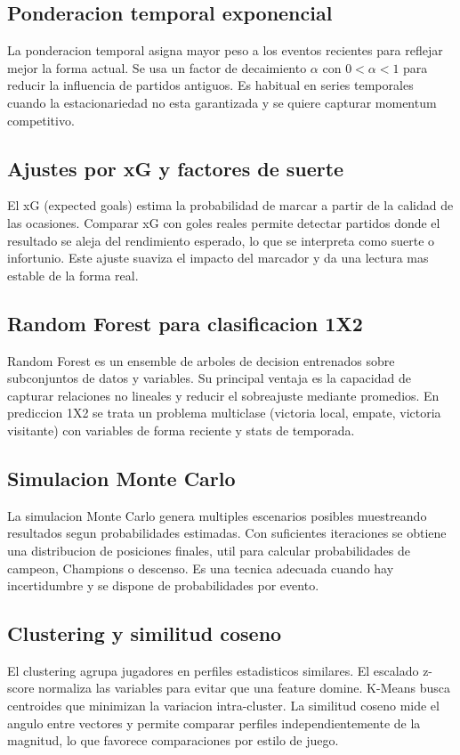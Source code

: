 \subsection{Ponderacion temporal exponencial}
La ponderacion temporal asigna mayor peso a los eventos recientes para reflejar mejor la forma actual. Se usa un factor de decaimiento $\alpha$ con $0 < \alpha < 1$ para reducir la influencia de partidos antiguos. Es habitual en series temporales cuando la estacionariedad no esta garantizada y se quiere capturar momentum competitivo.

\subsection{Ajustes por xG y factores de suerte}
El xG (expected goals) estima la probabilidad de marcar a partir de la calidad de las ocasiones. Comparar xG con goles reales permite detectar partidos donde el resultado se aleja del rendimiento esperado, lo que se interpreta como suerte o infortunio. Este ajuste suaviza el impacto del marcador y da una lectura mas estable de la forma real.

\subsection{Random Forest para clasificacion 1X2}
Random Forest es un ensemble de arboles de decision entrenados sobre subconjuntos de datos y variables. Su principal ventaja es la capacidad de capturar relaciones no lineales y reducir el sobreajuste mediante promedios. En prediccion 1X2 se trata un problema multiclase (victoria local, empate, victoria visitante) con variables de forma reciente y stats de temporada.

\subsection{Simulacion Monte Carlo}
La simulacion Monte Carlo genera multiples escenarios posibles muestreando resultados segun probabilidades estimadas. Con suficientes iteraciones se obtiene una distribucion de posiciones finales, util para calcular probabilidades de campeon, Champions o descenso. Es una tecnica adecuada cuando hay incertidumbre y se dispone de probabilidades por evento.

\subsection{Clustering y similitud coseno}
El clustering agrupa jugadores en perfiles estadisticos similares. El escalado z-score normaliza las variables para evitar que una feature domine. K-Means busca centroides que minimizan la variacion intra-cluster. La similitud coseno mide el angulo entre vectores y permite comparar perfiles independientemente de la magnitud, lo que favorece comparaciones por estilo de juego.

